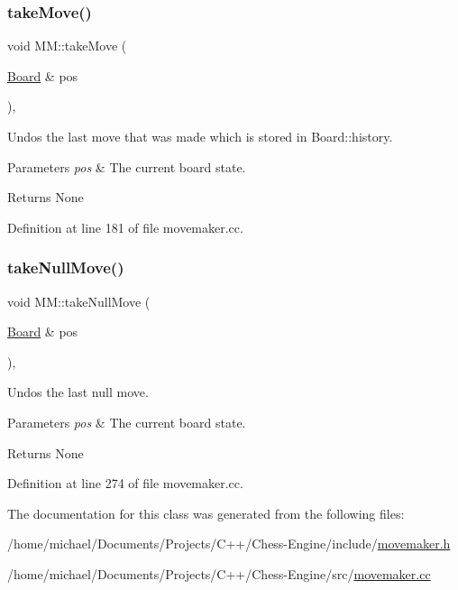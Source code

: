 \subsubsection{\texorpdfstring{take\+Move()}{takeMove()}}
{\footnotesize\ttfamily void M\+M\+::take\+Move (\begin{DoxyParamCaption}\item[{\mbox{\hyperlink{classBoard}{Board}} \&}]{pos }\end{DoxyParamCaption})\hspace{0.3cm}{\ttfamily [static]}, {\ttfamily [noexcept]}}



Undos the last move that was made which is stored in Board\+::history. 


\begin{DoxyParams}{Parameters}
{\em pos} & The current board state. \\
\hline
\end{DoxyParams}
\begin{DoxyReturn}{Returns}
None 
\end{DoxyReturn}


Definition at line 181 of file movemaker.\+cc.

\mbox{\label{classMM_aabe809e8405f8ea0666a7d6e25aedac5}} 
\subsubsection{\texorpdfstring{take\+Null\+Move()}{takeNullMove()}}
{\footnotesize\ttfamily void M\+M\+::take\+Null\+Move (\begin{DoxyParamCaption}\item[{\mbox{\hyperlink{classBoard}{Board}} \&}]{pos }\end{DoxyParamCaption})\hspace{0.3cm}{\ttfamily [static]}, {\ttfamily [noexcept]}}



Undos the last null move. 


\begin{DoxyParams}{Parameters}
{\em pos} & The current board state. \\
\hline
\end{DoxyParams}
\begin{DoxyReturn}{Returns}
None 
\end{DoxyReturn}


Definition at line 274 of file movemaker.\+cc.



The documentation for this class was generated from the following files\+:\begin{DoxyCompactItemize}
\item 
/home/michael/\+Documents/\+Projects/\+C++/\+Chess-\/\+Engine/include/\mbox{\hyperlink{movemaker_8h}{movemaker.\+h}}\item 
/home/michael/\+Documents/\+Projects/\+C++/\+Chess-\/\+Engine/src/\mbox{\hyperlink{movemaker_8cc}{movemaker.\+cc}}\end{DoxyCompactItemize}

